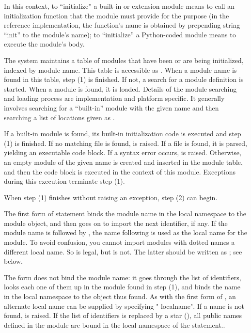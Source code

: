 In this context, to ``initialize'' a built-in or extension module means to
call an initialization function that the module must provide for the purpose
(in the reference implementation, the function's name is obtained by
prepending string ``init'' to the module's name); to ``initialize'' a
Python-coded module means to execute the module's body.
  
The system maintains a table of modules that have been or are being
initialized,
indexed by module name.  This table is
accessible as .  When a module name is found in
this table, step (1) is finished.  If not, a search for a module
definition is started.  When a module is found, it is loaded.  Details
of the module searching and loading process are implementation and
platform specific.  It generally involves searching for a ``built-in''
module with the given name and then searching a list of locations
given as .

If a built-in module is found, its built-in initialization code is
executed and step (1) is finished.  If no matching file is found,
 is raised.  If a file is found, it is parsed,
yielding an executable code block.  If a syntax error occurs,
 is raised.  Otherwise, an empty module of the given
name is created and inserted in the module table, and then the code
block is executed in the context of this module.  Exceptions during
this execution terminate step (1).

When step (1) finishes without raising an exception, step (2) can
begin.

The first form of  statement binds the module name in
the local namespace to the module object, and then goes on to import
the next identifier, if any.  If the module name is followed by
, the name following  is used as the local
name for the module. To avoid confusion, you cannot import modules
with dotted names  a different local name. So  is legal, but  is not.
The latter should be written as ;
see below.

The  form does not bind the module name: it goes through the
list of identifiers, looks each one of them up in the module found in step
(1), and binds the name in the local namespace to the object thus found. 
As with the first form of , an alternate local name can be
supplied by specifying " localname".  If a name is not found,
 is raised.  If the list of identifiers is replaced
by a star (\character{*}), all public names defined in the module are
bound in the local namespace of the  statement..

